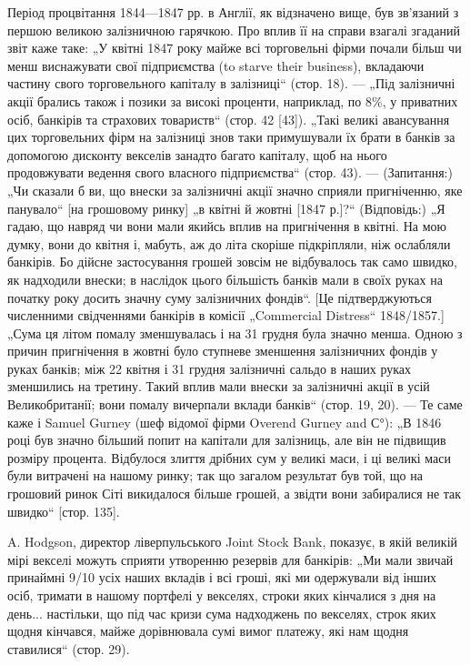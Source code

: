 Період процвітання 1844—1847 рр. в Англії, як відзначено вище, був зв’язаний
з першою великою залізничною гарячкою. Про вплив її на справи взагалі згаданий звіт каже таке: „У
квітні 1847 року майже всі торговельні фірми почали
більш чи менш виснажувати свої підприємства (to starve their business), вкладаючи частину свого
торговельного капіталу в залізниці“ (стор. 18). — „Під залізничні акції брались також і позики за
високі проценти, наприклад, по 8\%,
у приватних осіб, банкірів та страхових товариств“ (стор. 42 [43]). „Такі великі
авансування цих торговельних фірм на залізниці знов таки примушували їх брати
в банків за допомогою дисконту векселів занадто багато капіталу, щоб на нього
продовжувати ведення свого власного підприємства“ (стор. 43). — (Запитання:) „Чи
сказали б ви, що внески за залізничні акції значно сприяли пригніченню, яке
панувало“ [на грошовому ринку] „в квітні й жовтні [1847 р.]?“ (Відповідь:) „Я гадаю, що навряд чи
вони мали якийсь вплив на пригнічення в квітні. На мою думку,
вони до квітня і, мабуть, аж до літа скоріше підкріпляли, ніж ослабляли банкірів.
Бо дійсне застосування грошей зовсім не відбувалось так само швидко, як надходили внески; в наслідок
цього більшість банків мали в своїх руках на початку
року досить значну суму залізничних фондів“. [Це підтверджуються численними
свідченнями банкірів в комісії „Commercial Distress“ 1848/1857.] „Сума ця літом
помалу зменшувалась і на 31 грудня була значно менша. Одною з причин
пригнічення в жовтні було ступневе зменшення залізничних фондів у руках
банків; між 22 квітня і 31 грудня залізничні сальдо в наших руках зменшились
на третину. Такий вплив мали внески за залізничні акції в усій Великобританії;
вони помалу вичерпали вклади банків“ (стор. 19, 20). — Те саме каже і Samuel
Gurney (шеф відомої фірми Overend Gurney and С°): „В 1846 році був значно
більший попит на капітали для залізниць, але він не підвищив розміру процента. Відбулося злиття
дрібних сум у великі маси, і ці великі маси були витрачені на нашому ринку; так що загалом результат
був той, що на грошовий
ринок Сіті викидалося більше грошей, а звідти вони забиралися не так
швидко“ [стор. 135].

A. Hodgson, директор ліверпульського Joint Stock Bank, показує, в якій великій мірі векселі можуть
сприяти утворенню резервів для банкірів: „Ми мали
звичай принаймні 9/10 усіх наших вкладів і всі гроші, які ми одержували від
інших осіб, тримати в нашому портфелі у векселях, строки яких кінчалися
з дня на день... настільки, що під час кризи сума надходжень по векселях,
строк яких щодня кінчався, майже дорівнювала сумі вимог платежу, які нам
щодня ставилися“ (стор. 29).

